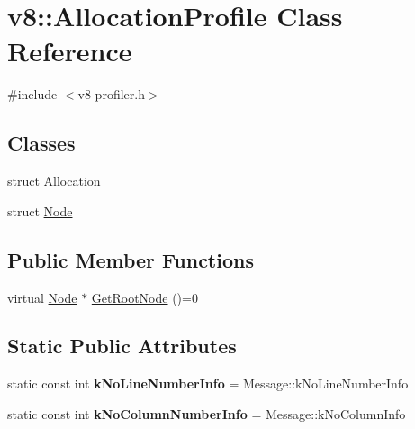 \hypertarget{classv8_1_1_allocation_profile}{}\section{v8\+:\+:Allocation\+Profile Class Reference}
\label{classv8_1_1_allocation_profile}


{\ttfamily \#include $<$v8-\/profiler.\+h$>$}

\subsection*{Classes}
\begin{DoxyCompactItemize}
\item 
struct \hyperlink{structv8_1_1_allocation_profile_1_1_allocation}{Allocation}
\item 
struct \hyperlink{structv8_1_1_allocation_profile_1_1_node}{Node}
\end{DoxyCompactItemize}
\subsection*{Public Member Functions}
\begin{DoxyCompactItemize}
\item 
virtual \hyperlink{structv8_1_1_allocation_profile_1_1_node}{Node} $\ast$ \hyperlink{classv8_1_1_allocation_profile_afea045dae30df5477088e2f0b7edb6c4}{Get\+Root\+Node} ()=0
\end{DoxyCompactItemize}
\subsection*{Static Public Attributes}
\begin{DoxyCompactItemize}
\item 
static const int {\bfseries k\+No\+Line\+Number\+Info} = Message\+::k\+No\+Line\+Number\+Info\hypertarget{classv8_1_1_allocation_profile_a26fdfe9e4846d26c83d0ad8c2ed2d783}{}\label{classv8_1_1_allocation_profile_a26fdfe9e4846d26c83d0ad8c2ed2d783}

\item 
static const int {\bfseries k\+No\+Column\+Number\+Info} = Message\+::k\+No\+Column\+Info\hypertarget{classv8_1_1_allocation_profile_a9cfa103f73e82629694eee3734826eb7}{}\label{classv8_1_1_allocation_profile_a9cfa103f73e82629694eee3734826eb7}

\end{DoxyCompactItemize}


